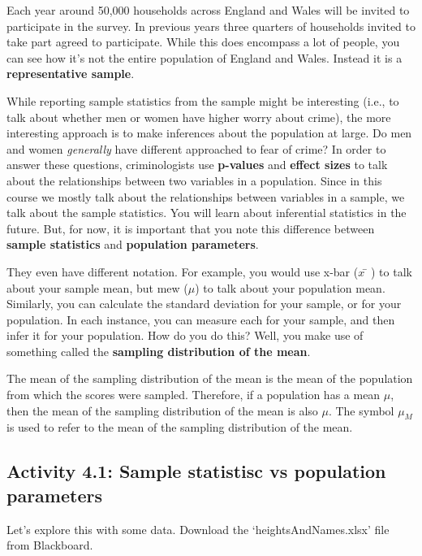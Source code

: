 \documentclass[
]{book}
\begin{document}
Each year around 50,000 households across England and Wales will be invited to participate in the survey. In previous years three quarters of households invited to take part agreed to participate. While this does encompass a lot of people, you can see how it's not the entire population of England and Wales. Instead it is a \textbf{representative sample}.

While reporting sample statistics from the sample might be interesting (i.e., to talk about whether men or women have higher worry about crime), the more interesting approach is to make inferences about the population at large. Do men and women \emph{generally} have different approached to fear of crime? In order to answer these questions, criminologists use \textbf{p-values} and \textbf{effect sizes} to talk about the relationships between two variables in a population. Since in this course we mostly talk about the relationships between variables in a sample, we talk about the sample statistics. You will learn about inferential statistics in the future. But, for now, it is important that you note this difference between \textbf{sample statistics} and \textbf{population parameters}.

They even have different notation. For example, you would use x-bar (\(x̄\)) to talk about your sample mean, but mew (\(μ\)) to talk about your population mean. Similarly, you can calculate the standard deviation for your sample, or for your population. In each instance, you can measure each for your sample, and then infer it for your population. How do you do this? Well, you make use of something called the \textbf{sampling distribution of the mean}.

The mean of the sampling distribution of the mean is the mean of the population from which the scores were sampled. Therefore, if a population has a mean \(μ\), then the mean of the sampling distribution of the mean is also \(μ\). The symbol \(μ_M\) is used to refer to the mean of the sampling distribution of the mean.

\hypertarget{activity-4.1-sample-statistisc-vs-population-parameters}{%
\subsection{Activity 4.1: Sample statistisc vs population parameters}\label{activity-4.1-sample-statistisc-vs-population-parameters}}

Let's explore this with some data. Download the `heightsAndNames.xlsx' file from Blackboard.
\end{document}
